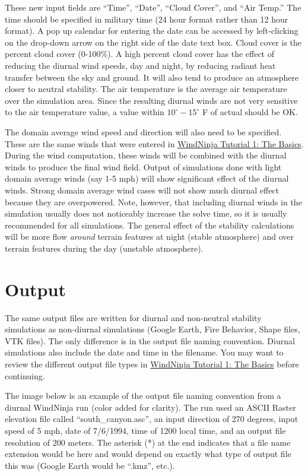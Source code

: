\documentclass[12pt]{article}
\begin{document}
These new input fields are “Time”, “Date”, “Cloud Cover”, and “Air Temp.”  The time should be specified in military time (24 hour format rather than 12 hour format).  A pop up calendar for entering the date can be accessed by left-clicking on the drop-down arrow on the right side of the date text box.  Cloud cover is the percent cloud cover (0-100\%).  A high percent cloud cover has the effect of reducing the diurnal wind speeds, day and night, by reducing radiant heat transfer between the sky and ground.  It will also tend to produce an atmosphere closer to neutral stability. The air temperature is the average air temperature over the simulation area.  Since the resulting diurnal winds are not very sensitive to the air temperature value, a value within $10^{\circ} - 15^{\circ}$ F of actual should be OK.

The domain average wind speed and direction will also need to be specified.  These are the same winds that were entered in \href{https://weather.firelab.org/windninja/tutorials/WindNinja_tutorial1.pdf}{WindNinja Tutorial 1: The Basics}.  During the wind computation, these winds will be combined with the diurnal winds to produce the final wind field.  Output of simulations done with light domain average winds (say 1-5 mph) will show significant effect of the diurnal winds.  Strong domain average wind cases will not show much diurnal effect because they are overpowered.  Note, however, that including diurnal winds in the simulation usually does not noticeably increase the solve time, so it is usually recommended for all simulations.  The general effect of the stability calculations will be more flow \textit{around} terrain features at night (stable atmosphere) and over terrain features during the day (unstable atmosphere).

\section{Output}

The same output files are written for diurnal and non-neutral stability simulations as non-diurnal simulations (Google Earth, Fire Behavior, Shape files, VTK files).  The only difference is in the output file naming convention.  Diurnal simulations also include the date and time in the filename.  You may want to review the different output file types in \href{https://weather.firelab.org/windninja/tutorials/WindNinja_tutorial1.pdf}{WindNinja Tutorial 1: The Basics} before continuing.

The image below is an example of the output file naming convention from a diurnal WindNinja run (color added for clarity).  The run used an ASCII Raster elevation file called “south\_canyon.asc”, an input direction of 270 degrees, input speed of 5 mph, date of 7/6/1994, time of 1200 local time, and an output file resolution of 200 meters.  The asterisk (*) at the end indicates that a file name extension would be here and would depend on exactly what type of output file this was (Google Earth would be “.kmz”, etc.).
\end{document}
